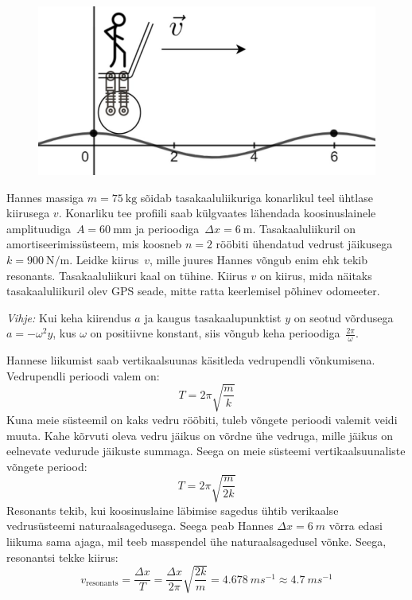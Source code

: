 \setAuthor{}

\begin{figure}
  \vspace{-5pt}
  \begin{center}
  \includegraphics[scale=0.1]{2020-v3g-04-yl.png}
  \end{center}
  \vspace{-25pt}
\end{figure}
Hannes massiga $m = \SI{75}{\kilo\gram}$ sõidab tasakaaluliikuriga  konarlikul
teel ühtlase kiirusega $v$. Konarliku tee profiili saab külgvaates lähendada
koosinuslainele amplituudiga~$A = \SI{60}{\milli\meter}$ ja
perioodiga~$\Delta x = \SI{6}{\meter}$. Tasakaaluliikuril on amortiseerimissüsteem,
mis koosneb $n=2$ rööbiti ühendatud vedrust jäikusega $k = \SI{900}{\newton\per\meter}$.
Leidke kiirus~$v$, mille juures Hannes võngub enim ehk tekib resonants.
Tasakaaluliikuri kaal on tühine. Kiirus $v$ on kiirus, mida näitaks
tasakaaluliikuril olev GPS seade, mitte ratta keerlemisel põhinev odomeeter.

\emph{Vihje:} Kui keha kiirendus $a$ ja kaugus tasakaalupunktist $y$ on seotud
võrdusega $a=-\omega^2 y$, kus $\omega$ on positiivne konstant, siis võngub keha
perioodiga~$\frac{2\pi}{\omega}$.


\hint

\solu
Hannese liikumist saab vertikaalsuunas käsitleda vedrupendli võnkumisena. Vedrupendli perioodi valem on: $$T=2\pi \sqrt{\frac{m}{k}}$$ Kuna meie süsteemil on kaks vedru rööbiti, tuleb võngete perioodi valemit veidi muuta. Kahe kõrvuti oleva vedru jäikus on võrdne ühe vedruga, mille jäikus on eelnevate vedurude jäikuste summaga. Seega on meie süsteemi vertikaalsuunaliste võngete periood:
$$T = 2\pi \sqrt{\frac{m}{2k}}$$
Resonants tekib, kui koosinuslaine läbimise sagedus ühtib verikaalse vedrusüsteemi naturaalsagedusega. Seega peab Hannes $\Delta x = \SI{6}{m}$ võrra edasi liikuma sama ajaga, mil teeb masspendel ühe naturaalsagedusel võnke. Seega, resonantsi tekke kiirus:
$$v_\mathrm{resonants}=\frac{\Delta x}{T}=\frac{\Delta x}{2 \pi} \sqrt{\frac{2k}{m}} = \SI{4.678}{m s^{-1}} \approx \SI{4.7}{m s^{-1}}$$
\probend